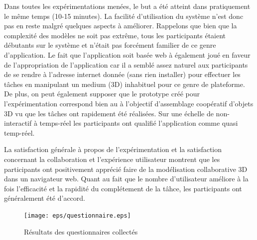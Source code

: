 Dans toutes les expérimentations menées, le but a été atteint dans pratiquement 
le même temps (10-15 minutes). La facilité d'utilisation du système n'est donc pas 
en reste malgré quelques aspects à améliorer. Rappelons que bien que la 
complexité des modèles ne soit pas extrême, tous les participants étaient 
débutants sur le système et n'était pas forcément familier de ce genre 
d'application. 
Le fait que l'application soit basée web à également joué en faveur de 
l'appropriation de l'application car il a semblé assez naturel aux participants de se 
rendre à l'adresse internet donnée (sans rien installer) pour effectuer les tâches en 
manipulant un medium (3D) inhabituel pour ce genre de plateforme. De plus, on 
peut également supposer que le prototype créé pour l'expérimentation correspond 
bien au à l'objectif d'assemblage coopératif d'objets 3D vu que les tâches ont 
rapidement été réalisées. Sur une échelle de \og non-interactif \fg{} à \og 
temps-réel\fg{} les participants ont qualifié l'application comme \og quasi 
temp-réel\fg{}. 

La satisfaction générale à propos de l'expérimentation et la satisfaction concernant 
la collaboration et l'expérience utilisateur montrent que les participants 
ont positivement apprécié faire de la modélisation collaborative 3D dans un 
navigateur web. Quant au fait que le nombre d'utilisateur améliore à la fois 
l'efficacité et la rapidité du complétement de la tâhce, les participants ont 
généralement été d'accord.

\begin{figure}[ht]
	\centering
	\texttt{[image: eps/questionnaire.eps]} 
	\caption{Résultats des questionnaires collectés}
	\label{fig:questionnaire}
\end{figure}
